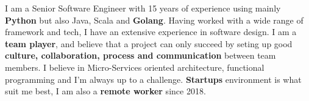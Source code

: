 

\begin{cvparagraph}

I am a Senior Software Engineer with 15 years of experience using mainly \textbf{Python} but also Java, Scala and \textbf{Golang}.\newline
Having worked with a wide range of framework and tech, I have an extensive experience in software design.\newline
I am a \textbf{team player}, and believe that a project can only succeed by seting up good \textbf{culture, collaboration, process and communication} between team members.\newline
I believe in Micro-Services oriented architecture, functional programming and I'm always up to a challenge.\newline
\textbf{Startups} environment is what suit me best, I am also a \textbf{remote worker} since 2018.

\end{cvparagraph}
